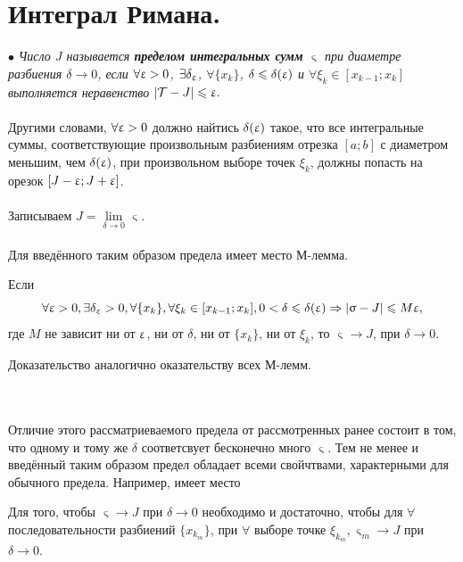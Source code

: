 \section{Интеграл Римана.}
$\bullet$ \textit{Число $J$ называется \textbf{пределом интегральных сумм} $ \upvarsigma $  при диаметре разбиения $ \delta \to 0 $, если $ \forall \upvarepsilon > 0$, $\exists \delta_{\upvarepsilon}$, $\forall \{x_k\}$, $\delta \leqslant \delta (\upvarepsilon)$ и $\forall \xi_k \in [x_{k - 1}; x_k] $ выполняется неравенство $ |\mathcal{T} - J |\leqslant \upvarepsilon.$}\\\\
Другими словами, $\forall \upvarepsilon > 0 $  должно найтись $ \delta (\upvarepsilon) $ такое, что все интегральные суммы, соответствующие произвольным разбиениям отрезка $[a; b]$  с диаметром меньшим, чем $\delta (\upvarepsilon) $, при произвольном выборе точек $\xi_k $, должны попасть на орезок $ [J - \upvarepsilon; J + \upvarepsilon]$. \\\\
Записываем $ J = \lim\limits_{\delta \rightarrow{} 0}\upvarsigma $. \\\\
Для введённого таким образом предела имеет место М-лемма. 
\begin{mlemma}
	Если $$ \forall \upvarepsilon > 0, \exists \delta_{\upvarepsilon} > 0, \forall \{x_k\}, \forall \xi_k \in [x_{k - 1}; x_k], 0 < \delta \leqslant \delta (\upvarepsilon) \Rightarrow |\upvarsigma - J| \leqslant M\upvarepsilon ,$$ где $M$ не зависит ни от $ \upvarepsilon $, ни от $ \delta $, ни от $ \{ x_k \} $, ни от $ \xi_k$, то $ \upvarsigma \rightarrow{} J $, при $ \delta \rightarrow{} 0 $.  
\end{mlemma}
\begin{Proof}
	Доказательство аналогично оказательству всех М-лемм.
\end{Proof}\\\\
Отличие этого рассматриеваемого предела от рассмотренных ранее состоит в том, что одному и тому же $ \delta $ соответсвует бесконечно много  $ \upvarsigma $. Тем не менее и введённый таким образом предел обладает всеми свойчтвами, характерными для обычного предела.
Например, имеет место
\begin{theorem}
	Для того, чтобы $ \upvarsigma \rightarrow{} J $ при $ \delta \rightarrow{} 0 $ необходимо и достаточно, чтобы для $ \forall $  последовательности разбиений $ \{ x_{k_m} \} $, при $ \forall $ выборе точке $ \xi_{k_m}, \upvarsigma_m \rightarrow{} J $  при $ \delta \rightarrow{} 0 $.
\end{theorem}
